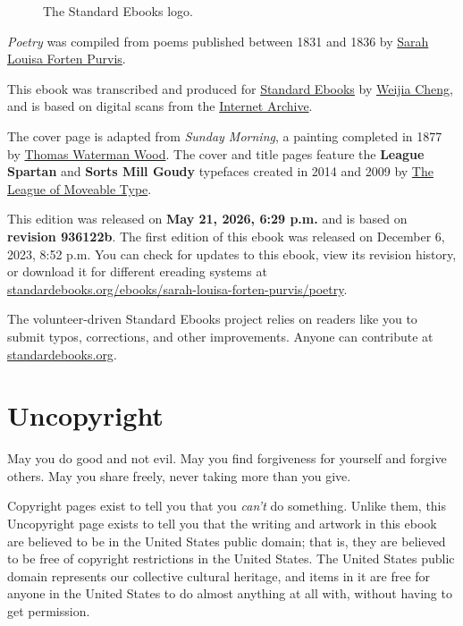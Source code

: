 \documentclass[11pt,a4paper]{article}
\begin{document}
\begin{figure}[h]
\caption{The Standard Ebooks logo.}
\end{figure}

\textit{Poetry} was compiled from poems published between 1831 and 1836 by \href{https://en.wikipedia.org/wiki/Sarah\_Louisa\_Forten\_Purvis}{Sarah Louisa Forten Purvis}.

This ebook was transcribed and produced for \href{https://standardebooks.org/}{Standard Ebooks} by \href{https://weijiarhymeswith.asia/}{Weijia Cheng},
and is based on digital scans from the \href{https://standardebooks.org/ebooks/sarah-louisa-forten-purvis/poetry\#page-scans}{Internet Archive}.

The cover page is adapted from \textit{Sunday Morning},
a painting completed in 1877 by \href{https://en.wikipedia.org/wiki/Thomas\_Waterman\_Wood}{Thomas Waterman Wood}.
The cover and title pages feature the \textbf{League Spartan} and \textbf{Sorts Mill Goudy} typefaces created in 2014 and 2009 by \href{https://www.theleagueofmoveabletype.com/}{The League of Moveable Type}.

This edition was released on \textbf{May 21, 2026, 6:29 p.m.} and is based on \textbf{revision 936122b}.
The first edition of this ebook was released on
December 6, 2023, 8:52 p.m.
You can check for updates to this ebook, view its revision history, or download it for different ereading systems at \href{https://standardebooks.org/ebooks/sarah-louisa-forten-purvis/poetry}{standardebooks.org/ebooks/sarah-louisa-forten-purvis/poetry}.

The volunteer-driven Standard Ebooks project relies on readers like you to submit typos, corrections, and other improvements. Anyone can contribute at \href{https://standardebooks.org/}{standardebooks.org}.

\section{Uncopyright}

May you do good and not evil.
May you find forgiveness for yourself and forgive others.
May you share freely, never taking more than you give.

Copyright pages exist to tell you that you \textit{can't} do something. Unlike them, this Uncopyright page exists to tell you that the writing and artwork in this ebook are believed to be in the United States public domain; that is, they are believed to be free of copyright restrictions in the United States. The United States public domain represents our collective cultural heritage, and items in it are free for anyone in the United States to do almost anything at all with, without having to get permission.
\end{document}
